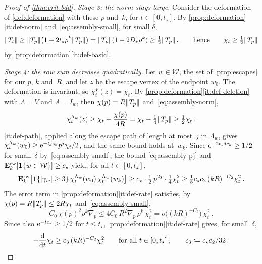 \begin{proof}[Proof of \cref{thm:crit-bdd}]
\emph{Stage 3: the norm stays large.}
Consider the deformation of \cref{def:deformation} with these $p$ and~$k$, for $t\in[0,t_\star]$. By
\cref{prop:deformation}\ref{it:def-norm} and~\eqref{eq:assembly-small}, for small $\delta$,
\begin{equation}\label{eq:assembly-norm}
  \lVert T_t\rVert\ge\lVert T_p\rVert\bigl(1-2t_\star\rho^k\lVert T_p\rVert\bigr)=\lVert T_p\rVert(1-2D_\star\rho^k)\ge\tfrac12\lVert T_p\rVert\,,
  \qquad\text{hence}\qquad
  \chi_t\ge\tfrac12\lVert T_p\rVert
\end{equation}
by \cref{prop:deformation}\ref{it:def-basic}.

\emph{Stage 4: the row sum decreases quadratically.}
Let $w\in\mathcal W$, the set of \cref{prop:escapes} for our $p$, $k$ and~$R$, and let $z$ be the
escape vertex of the endpoint $w_0$. The deformation is invariant, so $\chi_t^V(z)=\chi_t$. By
\cref{prop:deformation}\ref{it:def-deletion} with $\Lambda=V$ and $A=I_w$, then $\chi(p)=R\lVert T_p\rVert$
and~\eqref{eq:assembly-norm},
\begin{equation*}
  \chi^{\Lambda_w}_t(z)\ge\chi_t-\frac{\chi(p)}{4R}=\chi_t-\tfrac14\lVert T_p\rVert\ge\tfrac12\chi_t\,.
\end{equation*}
\ref{it:def-path}, applied along the escape path of length at most~$j$ in
$\Lambda_w$, gives $\chi^{\Lambda_w}_t(w_0)\ge\mathrm{e}^{-tjc_k}p^j\chi_t/2$, and the same bound holds at~$w_k$.
Since $\mathrm{e}^{-2t_\star jc_k}\ge1/2$ for small~$\delta$ by~\eqref{eq:assembly-small}, the bound
\eqref{eq:assembly-pj} and $\mathbf{E}^{\mathrm{rw}}_{k}[\mathbf{1}\{w\in\mathcal W\}]\ge c_\star$ yield, for all $t\in[0,t_\star]$,
\begin{equation*}
  \mathbf{E}^{\mathrm{rw}}_{k}\bigl[\mathbf{1}\{\lvert\gamma_w\rvert\ge3\}\,\chi^{\Lambda_w}_t(w_0)\,\chi^{\Lambda_w}_t(w_k)\bigr]
  \ge c_\star\cdot\tfrac12\,p^{2j}\cdot\tfrac14\chi_t^2
  \ge\tfrac18c_\star c_2\,(kR)^{-C_2}\chi_t^2\,.
\end{equation*}
The error term in \cref{prop:deformation}\ref{it:def-rate} satisfies, by $\chi(p)=R\lVert T_p\rVert\le2R\chi_t$
and~\eqref{eq:assembly-small},
\begin{equation*}
  C_0\,\chi(p)^2\rho^k\nabla_p\le4C_0\,R^2\nabla_p\,\rho^k\,\chi_t^2=o\bigl((kR)^{-C_2}\bigr)\,\chi_t^2\,.
\end{equation*}
Since also $\mathrm{e}^{-tc_k}\ge1/2$ for $t\le t_\star$, \cref{prop:deformation}\ref{it:def-rate} gives, for
small~$\delta$,
\begin{equation}\label{eq:assembly-ode}
  -\frac{\d}{\d t}\chi_t\ge c_3\,(kR)^{-C_2}\chi_t^2\qquad\text{for all }t\in[0,t_\star]\,,
  \qquad c_3\coloneqq c_\star c_2/32\,.
\end{equation}


\end{proof}
